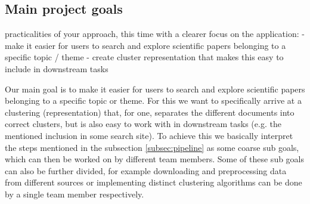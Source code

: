 \subsection{Main project goals}

practicalities of your approach, this time with a clearer focus on the application:
- make it easier for users to search and explore scientific papers belonging to a specific topic / theme
- create cluster representation that makes this easy to include in downstream tasks

Our main goal is to make it easier for users to search and explore scientific papers belonging to a specific topic or theme.
For this we want to specifically arrive at a clustering (representation) that, for one, separates the different documents into correct clusters, but is also easy to work with in downstream tasks (e.g. the mentioned inclusion in some search site).
To achieve this we basically interpret the steps mentioned in the subsection \ref{subsec:pipeline} as some coarse sub goals, which can then be worked on by different team members.
Some of these sub goals can also be further divided, for example downloading and preprocessing data from different sources or implementing distinct clustering algorithms can be done by a single team member respectively.